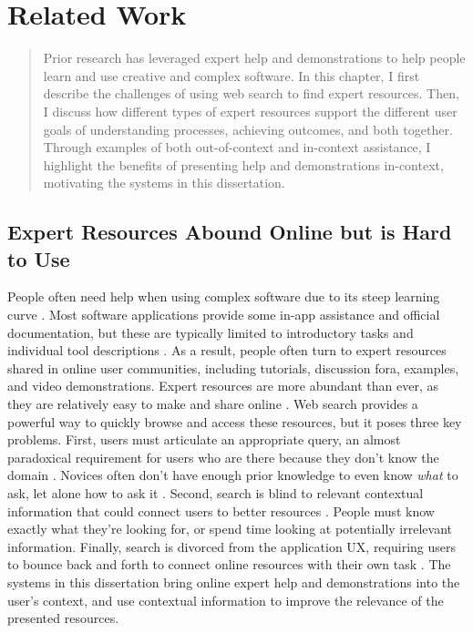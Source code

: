 \chapter{Related Work}
\begin{quote}
Prior research has leveraged expert help and demonstrations to help people learn and use creative and complex software. In this chapter, I first describe the challenges of using web search to find expert resources. Then, I discuss how different types of expert resources support the different user goals of understanding processes, achieving outcomes, and both together. Through examples of both out-of-context and in-context assistance, I highlight the benefits of presenting help and demonstrations in-context, motivating the systems in this dissertation.
\end{quote}

\section{Expert Resources Abound Online but is Hard to Use}
People often need help when using complex software due to its steep learning curve \cite{Adar2014}. Most software applications provide some in-app assistance and official documentation, but these are typically limited to introductory tasks and individual tool descriptions \cite{Lafreniere2014a}. As a result, people often turn to expert resources shared in online user communities, including tutorials, discussion fora, examples, and video demonstrations. Expert resources are more abundant than ever, as they are relatively easy to make and share online \cite{Pongnumkul2011, Lafreniere2013a}. Web search provides a powerful way to quickly browse and access these resources, but it poses three key problems. First, users must articulate an appropriate query, an almost paradoxical requirement for users who are there because they don't know the domain \cite{Russell2011}. Novices often don't have enough prior knowledge to even know \textit{what} to ask, let alone how to ask it \cite{Miyake1979}. Second, search is blind to relevant contextual information that could connect users to better resources \cite{Ekstrand2011, Kraft2005, Finkelstein2002}. People must know exactly what they're looking for, or spend time looking at potentially irrelevant information. Finally, search is divorced from the application UX, requiring users to bounce back and forth to connect online resources with their own task \cite{Fourney2014Intertwine}. The systems in this dissertation bring online expert help and demonstrations into the user's context, and use contextual information to improve the relevance of the presented resources.

